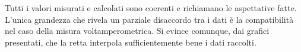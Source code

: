 Tutti i valori misurati e calcolati sono coerenti e richiamano le aspettative fatte.
L'unica grandezza che rivela un parziale disaccordo tra i dati \`e la compatibilit\`a nel caso della misura voltamperometrica. Si evince comunque, dai grafici presentati, che la retta interpola sufficientemente bene i dati raccolti.
